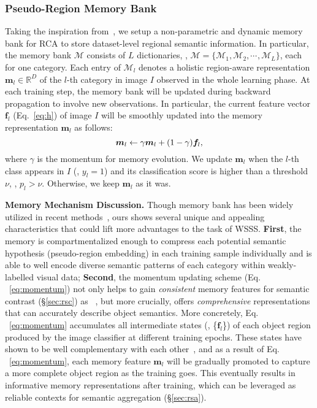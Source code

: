 \documentclass[10pt,twocolumn,letterpaper]{article}
\begin{document}
\subsubsection{Pseudo-Region Memory Bank}\label{sec:memorybank}
Taking the inspiration from~\cite{xiao2017joint,wu2018unsupervised}, we setup a non-parametric and dynamic memory bank for RCA to store dataset-level regional semantic information. In particular, the memory bank $\mathcal{M}$ consists of $L$ dictionaries,  \ie, $\mathcal{M}\!=\!\{\mathcal{M}_{1}, \mathcal{M}_{2}, \cdots_{\!}, \mathcal{M}_L\}$, each for one category. Each  entry of $\mathcal{M}_l$ denotes a holistic region-aware representation $\bm{m}_{l}\!\in\!\mathbb{R}^{D}$  of the $l$-th category in image $I$ observed in the whole learning phase. At each training step, the memory bank will be  updated during backward propagation to involve new observations. In particular, the current feature vector $\bm{f}_{l}$ (Eq.~\ref{eq:h}) of image $I$ will be smoothly updated into the memory representation $\bm{m}_l$ as follows:
\vspace{-3pt}
\begin{equation}\small\label{eq:momentum}
	\bm{m}_l \leftarrow \gamma\bm{m}_l + (1-\gamma)\bm{f}_{l},
	\vspace{-1pt}
\end{equation}
where $\gamma$ is the momentum for memory evolution.  We update $\bm{m}_l$ when the $l$-th class appears in $I$ (\ie, $y_l\!=\!1$) and its classification score is higher than a threshold $\nu$, \ie, $p_l\!>\!\nu$. Otherwise, we keep $\bm{m}_l$ as it was.








\noindent\textbf{Memory Mechanism Discussion.} 
Though memory bank has been widely utilized in recent methods~\cite{xiao2017joint,wu2018unsupervised,he2020momentum}, ours shows several unique and appealing characteristics that could lift more advantages to the task of \mbox{WSSS}. \textbf{First}, the memory is compartmentalized enough to compress each potential semantic hypothesis (\ie pseudo-region embedding) in each training sample individually and is able to well encode diverse semantic patterns of each category within weakly-labelled visual data; \textbf{Second}, the momentum updating scheme (Eq.$_{\!}$~\ref{eq:momentum}) not only helps to gain \textit{consistent} memory features for semantic contrast (\S\ref{sec:rsc}) as ~\cite{wu2018unsupervised,he2020momentum}, but more crucially, offers \textit{comprehensive} representations that can accurately describe object semantics. More concretely, Eq.$_{\!}$~\ref{eq:momentum} accumulates all intermediate states (\eg, \{$\bm{f}_l$\}) of each object region produced by the image classifier at different training epochs. These states have shown to be well complementary with each other~\cite{jiang2019integral}, and as a result of Eq.$_{\!}$~\ref{eq:momentum}, each memory feature $\bm{m}_l$ will be gradually promoted to capture a more complete object region as the training goes. This eventually results in informative memory representations after training, which can be leveraged as reliable  contexts for  semantic aggregation (\S\ref{sec:rsa}). 
\end{document}
